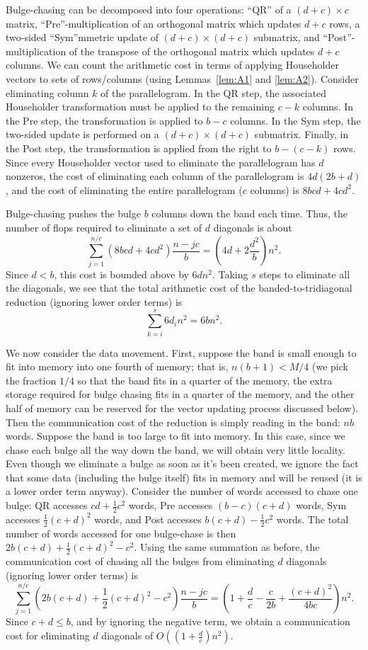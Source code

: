 \documentclass{article}
\def\lt{\left}
\def\rt{\right}
\theoremstyle{definition}
\begin{document}
Bulge-chasing can be decomposed into four operations: ``QR'' of a $(d+c)\times c$ matrix, ``Pre''-multiplication of an orthogonal matrix which updates $d+c$ rows, a two-sided ``Sym''mmetric update of $(d+c)\times (d+c)$ submatrix, and ``Post''-multiplication of the transpose of the orthogonal matrix which updates $d+c$ columns.  We can count the arithmetic cost in terms of applying Householder vectors to sets of rows/columns (using Lemmas~\ref{lem:A1} and \ref{lem:A2}).  Consider eliminating column $k$ of the parallelogram.  In the QR step, the associated Householder transformation must be applied to the remaining $c-k$ columns.  In the Pre step, the transformation is applied to $b-c$ columns.  In the Sym step, the two-sided update is performed on a $(d+c)\times (d+c)$ submatrix.  Finally, in the Post step, the transformation is applied from the right to $b-(c-k)$ rows.  Since every Householder vector used to eliminate the parallelogram has $d$ nonzeros, the cost of eliminating each column of the parallelogram is $4d(2b+d)$, and the cost of eliminating the entire parallelogram ($c$ columns) is $8bcd+4cd^2$.

Bulge-chasing pushes the bulge $b$ columns down the band each time.  Thus, the number of flops required to eliminate a set of $d$ diagonals is about
$$\sum_{j=1}^{n/c} \lt(8bcd+4cd^2\rt) \frac{n-jc}{b} = (4d + 2\frac{d^2}{b})n^2.$$
Since $d<b$, this cost is bounded above by $6dn^2$.  Taking $s$ steps to eliminate all the diagonals, we see that the total arithmetic cost of the banded-to-tridiagonal reduction (ignoring lower order terms) is
$$\sum_{k=i}^s 6 d_i n^2 = 6bn^2.$$

We now consider the data movement.  First, suppose the band is small enough to fit into memory into one fourth of memory; that is, $n(b+1)<M/4$ (we pick the fraction $1/4$ so that the band fits in a quarter of the memory, the extra storage required for bulge chasing fits in a quarter of the memory, and the other half of memory can be reserved for the vector updating process discussed below).  Then the communication cost of the reduction is simply reading in the band: $nb$ words.  Suppose the band is too large to fit into memory.  In this case, since we chase each bulge all the way down the band, we will obtain very little locality.  Even though we eliminate a bulge as soon as it's been created, we ignore the fact that some data (including the bulge itself) fits in memory and will be reused (it is a lower order term anyway).  Consider the number of words accessed to chase one bulge: QR accesses $cd+\frac12 c^2$ words, Pre accesses $(b-c)(c+d)$ words, Sym accesses $\frac12(c+d)^2$ words, and Post accesses $b(c+d)-\frac12c^2$ words.  The total number of words accessed for one bulge-chase is then $2b(c+d)+\frac12(c+d)^2 - c^2$.  Using the same summation as before, the communication cost of chasing all the bulges from eliminating $d$ diagonals (ignoring lower order terms) is
$$\sum_{j=1}^{n/c} \lt(2b(c+d)+\frac12(c+d)^2 - c^2\rt) \frac{n-jc}{b} = \lt(1+\frac dc - \frac{c}{2b} + \frac{(c+d)^2}{4bc}\rt)n^2.$$
Since $c+d\leq b$, and by ignoring the negative term, we obtain a communication cost for eliminating $d$ diagonals of $O\lt(\lt(1+\frac dc\rt)n^2\rt)$.
\end{document}
